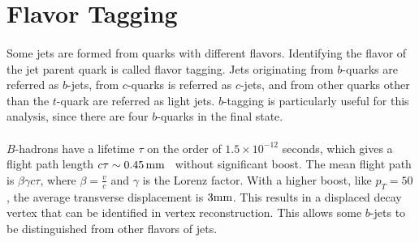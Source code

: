 \section{Flavor Tagging}
\label{sec:btag_70wp}
\paragraph{}
Some jets are formed from quarks with different flavors. 
Identifying the flavor of the jet parent quark is called flavor tagging. 
Jets originating from $b$-quarks are referred as $b$-jets, from $c$-quarks is referred as $c$-jets, and from other quarks other than the $t$-quark are referred as light jets.
$b$-tagging is particularly useful for this analysis, since there are four $b$-quarks in the final state.

\paragraph{}
$B$-hadrons have a lifetime $\tau$ on the order of $1.5 \times 10^{-12}$ seconds, which gives a flight path length $c\tau \sim 0.45\,\rm mm$~\cite{Pdg} without significant boost.
The mean flight path is $\beta\gamma c\tau$, where $\beta=\frac{v}{c}$ and $\gamma$ is the Lorenz factor.
With a higher boost, like $p_T = 50$ \GeV, the average transverse displacement is $3\rm mm$.
This results in a displaced decay vertex that can be identified in vertex reconstruction. 
This allows some $b$-jets to be distinguished from other flavors of jets.

